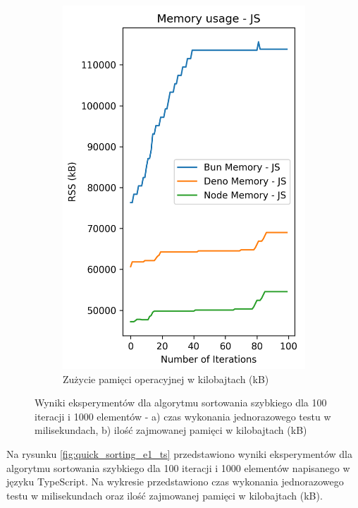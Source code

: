 \begin{figure}[H]
\begin{subfigure}[b]{0.4\textwidth}
    \includegraphics[width=\textwidth]{Figures/sorting/sorting_quick_100_1000_js_memory.png}
    \caption{Zużycie pamięci operacyjnej w kilobajtach (kB)}
    \label{fig:quick_sorting_e1_memory}
  \end{subfigure}
  \caption{Wyniki eksperymentów dla algorytmu sortowania szybkiego dla 100 iteracji i 1000 elementów - a) czas wykonania jednorazowego testu w milisekundach, b) ilość zajmowanej pamięci w kilobajtach (kB)}
  \label{fig:quick_sorting_e1}
\end{figure}

Na rysunku \ref{fig:quick_sorting_e1_ts} przedstawiono wyniki eksperymentów dla algorytmu sortowania szybkiego dla 100 iteracji i 1000 elementów napisanego w języku TypeScript. Na wykresie przedstawiono czas wykonania jednorazowego testu w milisekundach oraz ilość zajmowanej pamięci w kilobajtach (kB).

